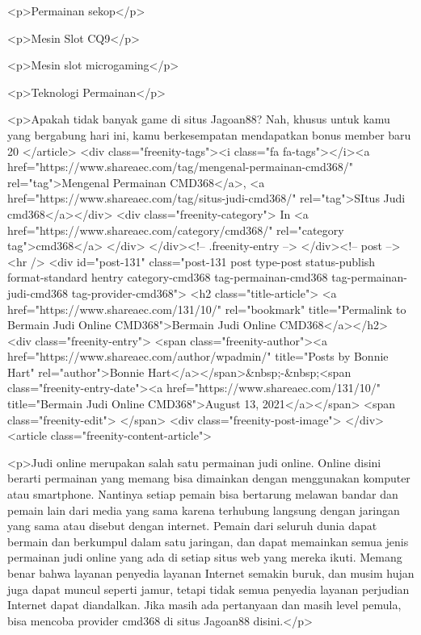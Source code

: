 <p>Permainan sekop</p>



<p>Mesin Slot CQ9</p>



<p>Mesin slot microgaming</p>



<p>Teknologi Permainan</p>



<p>Apakah tidak banyak game di situs Jagoan88? Nah, khusus untuk kamu yang bergabung hari ini, kamu berkesempatan mendapatkan bonus member baru 20%
									</article>
																			<div class="freenity-tags"><i class="fa fa-tags"></i><a href="https://www.shareaec.com/tag/mengenal-permainan-cmd368/" rel="tag">Mengenal Permainan CMD368</a>, <a href="https://www.shareaec.com/tag/situs-judi-cmd368/" rel="tag">SItus Judi cmd368</a></div>
																			<div class="freenity-category">
											In <a href="https://www.shareaec.com/category/cmd368/" rel="category tag">cmd368</a>										</div>
																	</div><!-- .freenity-entry -->
							</div><!-- post -->
							<hr />
													<div id="post-131" class="post-131 post type-post status-publish format-standard hentry category-cmd368 tag-permainan-cmd368 tag-permainan-judi-cmd368 tag-provider-cmd368">
								<h2 class="title-article">
									<a href="https://www.shareaec.com/131/10/" rel="bookmark" title="Permalink to Bermain Judi Online CMD368">Bermain Judi Online CMD368</a></h2>
								<div class="freenity-entry">
									<span class="freenity-author"><a href="https://www.shareaec.com/author/wpadmin/" title="Posts by Bonnie Hart" rel="author">Bonnie Hart</a></span>&nbsp;-&nbsp;<span class="freenity-entry-date"><a href="https://www.shareaec.com/131/10/" title="Bermain Judi Online CMD368">August 13, 2021</a></span>
									<span class="freenity-edit"> </span>
									<div class="freenity-post-image">  </div>
																		<article class="freenity-content-article">
										
<p>Judi online merupakan salah satu permainan judi online. Online disini berarti permainan yang memang bisa dimainkan dengan menggunakan komputer atau smartphone. Nantinya setiap pemain bisa bertarung melawan bandar dan pemain lain dari media yang sama karena terhubung langsung dengan jaringan yang sama atau disebut dengan internet. Pemain dari seluruh dunia dapat bermain dan berkumpul dalam satu jaringan, dan dapat memainkan semua jenis permainan judi online yang ada di setiap situs web yang mereka ikuti. Memang benar bahwa layanan penyedia layanan Internet semakin buruk, dan musim hujan juga dapat muncul seperti jamur, tetapi tidak semua penyedia layanan perjudian Internet dapat diandalkan. Jika masih ada pertanyaan dan masih level pemula, bisa mencoba provider cmd368 di situs Jagoan88 disini.</p>



